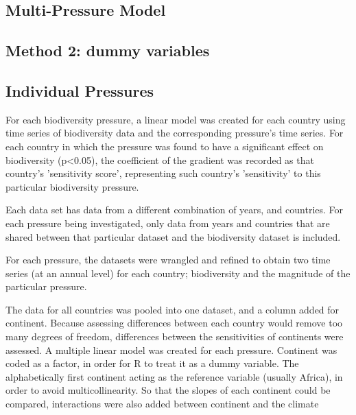 \documentclass[11pt, a4paper, titlepage]{article}
\begin{document}
	
	\subsection*{Multi-Pressure Model}
	
	\subsection*{Method 2: dummy variables}
	
	\subsection*{Individual Pressures}
	For each biodiversity pressure, a linear model was created for each country using time series of biodiversity data and the corresponding pressure's time series. For each country in which the pressure was found to have a significant effect on biodiversity (p<0.05), the coefficient of the gradient was recorded as that country's 'sensitivity score', representing such country's 'sensitivity' to this particular biodiversity pressure. \newline

Each data set has data from a different combination of years, and countries. For each pressure being investigated, only data from years and countries that are shared between that particular dataset and the biodiversity dataset is included. \newline

For each pressure, the datasets were wrangled and refined to obtain two time series (at an annual level) for each country; biodiversity and the magnitude of the particular pressure. 

The data for all countries was pooled into one dataset, and a column added for continent. Because assessing differences between each country would remove too many degrees of freedom, differences between the sensitivities of continents were assessed. A multiple linear model was created for each pressure. Continent was coded as a factor, in order for R to treat it as a dummy variable. The alphabetically first continent acting as the reference variable (usually Africa), in order to avoid multicollinearity. So that the slopes of each continent could be compared, interactions were also added between continent and the climate \newline
\end{document}
